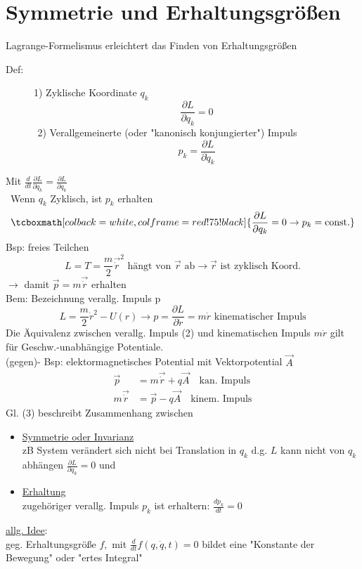 \documentclass[titlepage,12pt,a4paper,ngerman]{report}
\newcommand{\tx}[1]{\textrm{#1}}
\newcommand{\rmbox}[1]{\tcboxmath[colback=white,colframe=red!75!black]{#1}} %
\renewcommand{\boxed}{\rmbox}
\begin{document}
\section{Symmetrie und Erhaltungsgrößen}
Lagrange-Formelismus erleichtert das Finden von Erhaltungsgrößen
\begin{description}
	\item [Def:] 1) Zyklische Koordinate $q_k$
	$$\frac{\partial L}{\partial q_k} = 0$$
	$\ \,$2) Verallgemeinerte (oder "kanonisch konjungierter") Impuls
	$$p_k = \frac{\partial L}{\partial \dot q_k}$$
\end{description}
Mit $\frac{d}{dt}\frac{\partial L}{\partial \dot q_k} = \frac{\partial L}{\partial q_k}$\\\
Wenn $q_k$ Zyklisch, ist $p_k$ erhalten
$$\boxed{\frac{\partial L}{\partial q_k} = 0 \rightarrow p_k = \tx{const.}}$$
Bsp: freies Teilchen
$$L = T = \frac{m}{2} \vec{\dot r}^2 \tx{  hängt von }\vec{r} \tx{ ab} \rightarrow \vec{r} \tx{ ist zyklisch Koord.}$$
$\rightarrow$ damit $ \vec{p} = m \vec{\dot r}$ erhalten\\
Bem: Bezeichnung verallg. Impuls p
$$L = \frac{m}{2} \dot r^2 - U(r) \rightarrow p = \frac{\partial L}{\partial \dot r} = m \dot r \tx{ kinematischer Impuls}$$
Die Äquivalenz zwischen verallg. Impuls (2) und kinematischen Impuls $m \dot r$ gilt für Geschw.-unabhängige Potentiale.\\
(gegen)- Bsp: elektormagnetisches Potential mit Vektorpotential $\vec{A}$
\begin{align*}
\vec{p} &= m \vec{\dot r} + q \vec{A} \quad \tx{kan. Impuls}\\
m \vec{\dot r} &= \vec{p} - q \vec{A} \quad \tx{kinem. Impuls}
\end{align*}
Gl. (3) beschreibt Zusammenhang zwischen 
\begin{itemize}
	\item \underline{Symmetrie oder Invarianz}\\
	zB System verändert sich nicht bei Translation in $q_k$ d.g. $L$ kann nicht von $q_k$ abhängen $\frac{\partial L}{\partial q_k} = 0$ und
	\item \underline{Erhaltung}\\
	zugehöriger verallg. Impuls $p_k$ ist erhaltern: $\frac{dp_k}{dt} = 0$
\end{itemize}
\underline{allg. Idee}:\\
\indent geg. Erhaltungsgröße $f,$ mit $\frac{d}{dt} f (q, \dot q,t ) = 0$ bildet eine "Konstante der Bewegung" oder "ertes Integral"\\
\end{document}
